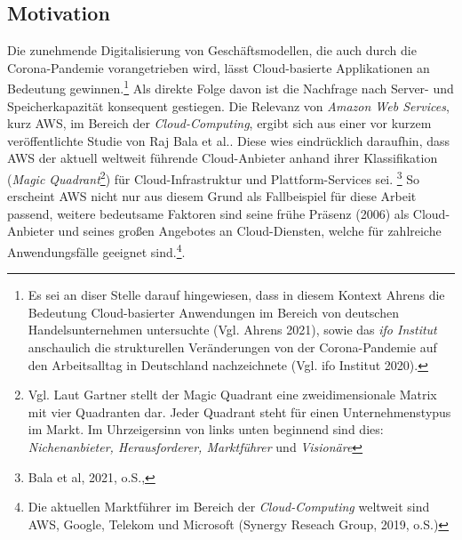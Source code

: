 \subsection{Motivation}
Die zunehmende Digitalisierung von Geschäftsmodellen, die auch durch die Corona-Pandemie vorangetrieben wird, lässt Cloud-basierte Applikationen an Bedeutung gewinnen.\footnote{Es sei an diser Stelle darauf hingewiesen, dass in diesem Kontext Ahrens die Bedeutung Cloud-basierter Anwendungen im Bereich von deutschen Handelsunternehmen untersuchte (Vgl. Ahrens 2021)\cite{STA3}, sowie das \textit{ifo Institut} anschaulich die strukturellen Veränderungen von der Corona-Pandemie auf den Arbeitsalltag in Deutschland nachzeichnete (Vgl. ifo Institut 2020)\cite{STA2}.} Als direkte Folge davon ist die Nachfrage nach Server- und Speicherkapazität konsequent gestiegen.
Die Relevanz von \textit{Amazon Web Services}, kurz AWS, im Bereich der \textit{Cloud-Computing}, ergibt sich aus einer vor kurzem veröffentlichte Studie von Raj Bala et al.. Diese wies eindrücklich daraufhin, dass AWS der aktuell weltweit führende Cloud-Anbieter anhand ihrer Klassifikation (\textit{Magic Quadrant}\footnote{Vgl.  Laut Gartner stellt der Magic Quadrant eine zweidimensionale Matrix mit vier Quadranten dar. Jeder Quadrant steht für einen Unternehmenstypus im Markt. Im Uhrzeigersinn von links unten beginnend sind dies: \textit{Nichenanbieter, Herausforderer, Marktführer }und \textit{Visionäre}}) für Cloud-Infrastruktur und Plattform-Services sei. \footnote{Bala et al, 2021, o.S.,\cite{G01}}
So erscheint AWS nicht nur aus diesem Grund als Fallbeispiel für diese Arbeit passend, weitere bedeutsame Faktoren sind seine frühe Präsenz (2006) als Cloud-Anbieter und seines großen Angebotes an Cloud-Diensten, welche für zahlreiche Anwendungsfälle geeignet sind.\footnote{Die aktuellen Marktführer im Bereich der \textit{Cloud-Computing} weltweit sind AWS, Google, Telekom und Microsoft (Synergy Reseach Group, 2019, o.S.\cite{STA6})}.

